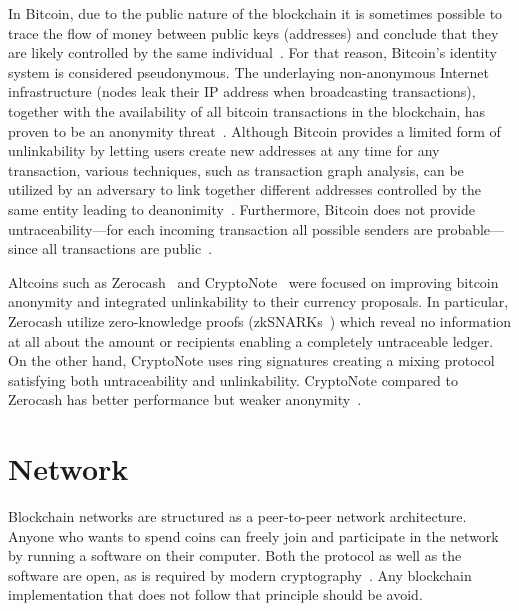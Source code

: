 In Bitcoin, due to the public nature of the blockchain it is sometimes possible to trace the flow of money between public keys (addresses) and conclude that they are likely controlled by the same
individual~\cite{7163021,10.1007/978-3-319-17016-9_1}. For that reason, Bitcoin's identity system is considered pseudonymous. The underlaying non-anonymous Internet infrastructure (nodes leak their IP address when broadcasting transactions),
together with the availability of all bitcoin transactions in the blockchain, has proven to be an anonymity threat~\cite{10.1007/978-3-319-17016-9_1, 7163021,Meiklejohn:2013:FBC:2504730.2504747,6113303,10.1007/978-3-642-39884-1_2,fi5020237}.
Although Bitcoin provides a limited form of unlinkability by letting users create new addresses at any time for any transaction, various techniques, such as transaction graph analysis, can be utilized by an adversary to link together different addresses controlled
by the same entity leading to deanonimity~\cite{7163021,Meiklejohn:2013:FBC:2504730.2504747,6113303,10.1007/978-3-642-39884-1_2,fi5020237}. Furthermore, Bitcoin does not provide untraceability---for each incoming transaction all possible senders are probable---since all transactions are public~\cite{cryptonote}.

Altcoins such as Zerocash~\cite{zcash} and CryptoNote~\cite{cryptonote} were focused on improving bitcoin anonymity and integrated unlinkability to their currency proposals.
In particular, Zerocash utilize zero-knowledge proofs (zkSNARKs~\cite{10.1007/978-3-642-40084-1_6}) which reveal no information at all about the amount or recipients enabling a completely untraceable ledger. On the other hand, CryptoNote uses ring signatures creating a mixing protocol satisfying both untraceability and unlinkability. CryptoNote compared to Zerocash has better performance but weaker anonymity~\cite{7163021}.

\section{Network}\label{blockchain:network}

Blockchain networks are structured as a peer-to-peer network architecture. Anyone who wants to spend coins can freely join and participate in the network by running a software on their computer. Both the protocol as well as the software are open, as is required by modern cryptography~\cite{zindros_thesis}. Any blockchain implementation that does not follow that principle should be avoid.

